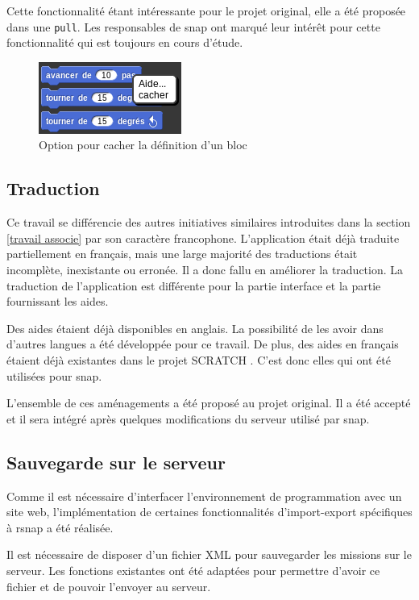 Cette fonctionnalité étant intéressante pour le projet original, elle a été proposée dans une \texttt{\gls{pull}}. Les responsables de \gls{snap} ont marqué leur intérêt pour cette fonctionnalité qui est toujours en cours d'étude.
\begin{figure}
  \begin{center}
    \includegraphics[scale=0.5]{content/7-solution/2-snap/images/cacher}
    \caption{Option pour cacher la définition d'un bloc}
    \label{fig:cacher}
  \end{center}
\end{figure}

\subsection{Traduction}
Ce travail se différencie des autres initiatives similaires introduites dans la section \ref{travail associe} par son caractère francophone. L'application était déjà traduite partiellement en français, mais une large majorité des traductions était incomplète, inexistante ou erronée. Il a donc fallu en améliorer la traduction. La traduction de l'application est différente pour la partie interface et la partie fournissant les aides.

Des aides étaient déjà disponibles en anglais. La possibilité de les avoir dans d'autres langues a été développée pour ce travail. De plus, des aides en français étaient déjà existantes dans le projet SCRATCH \cite{scratch-translation}. C'est donc elles qui ont été utilisées pour \gls{snap}.

L'ensemble de ces aménagements a été proposé au projet original. Il a été accepté et il sera intégré après quelques modifications du serveur utilisé par \gls{snap}.

\subsection{Sauvegarde sur le serveur}
Comme il est nécessaire d'interfacer l'environnement de programmation avec un site web, l'implémentation de certaines fonctionnalités d'import-export spécifiques à \gls{rsnap} a été réalisée.

Il est nécessaire de disposer d'un fichier XML pour sauvegarder les \glspl{mission} sur le serveur. Les fonctions existantes ont été adaptées pour permettre d'avoir ce fichier et de pouvoir l'envoyer au serveur.

